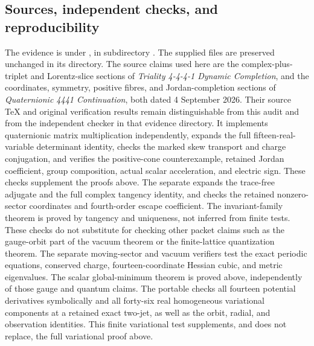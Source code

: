 



\subsection{Sources, independent checks, and reproducibility}

The evidence is under ,
in subdirectory .
The supplied files are preserved unchanged in its  directory.
The source claims used here are the complex-plus-triplet and Lorentz-slice
sections of \emph{Triality 4-4-4-1 Dynamic Completion}, and the coordinates,
symmetry, positive fibres, and Jordan-completion sections of
\emph{Quaternionic 4441 Continuation}, both dated 4 September 2026.
Their source TeX and original verification results remain distinguishable
from this audit and from the independent checker 
in that evidence directory.
It implements quaternionic matrix multiplication independently, expands
the full fifteen-real-variable determinant identity, checks the marked
skew transport and charge conjugation, and verifies the positive-cone
counterexample, retained Jordan coefficient, group composition, actual
scalar acceleration, and electric sign. These checks supplement the proofs
above. The separate  expands the
trace-free adjugate and the full complex tangency identity, and checks the
retained nonzero-sector coordinates and fourth-order escape coefficient.
The invariant-family theorem is proved by tangency and uniqueness, not
inferred from finite tests. These checks do not substitute for checking
other packet claims such as the gauge-orbit part of the vacuum theorem
or the finite-lattice quantization theorem. The separate moving-sector and
vacuum verifiers test the exact periodic equations, conserved charge,
fourteen-coordinate Hessian cubic, and metric eigenvalues. The scalar
global-minimum theorem is proved above, independently of those gauge and
quantum claims.
The portable  checks all fourteen potential
derivatives symbolically and all forty-six real homogeneous variational
components at a retained exact two-jet, as well as the orbit, radial,
and observation identities. This finite variational test supplements,
and does not replace, the full variational proof above.
